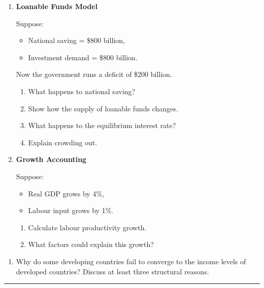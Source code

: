 \documentclass[12pt]{article}
\begin{document}
\begin{enumerate}[label=\textbf{\arabic*.}, start=4]

\item \textbf{Loanable Funds Model}

Suppose:
\begin{itemize}
    \item National saving = \$800 billion,
    \item Investment demand = \$800 billion.
\end{itemize}

Now the government runs a deficit of \$200 billion.

\begin{enumerate}
    \item[(a)] What happens to national saving?
    \item[(b)] Show how the supply of loanable funds changes.
    \item[(c)] What happens to the equilibrium interest rate?
    \item[(d)] Explain crowding out.
\end{enumerate}
\newpage
\item \textbf{Growth Accounting}

Suppose:
\begin{itemize}
    \item Real GDP grows by 4\%,
    \item Labour input grows by 1\%.
\end{itemize}

\begin{enumerate}
    \item[(a)] Calculate labour productivity growth.
    \item[(b)] What factors could explain this growth?
\end{enumerate}

\end{enumerate}



\begin{enumerate}[label=\textbf{\arabic*.}, start=6]

\item Why do some developing countries fail to converge to the income levels of developed countries? 
Discuss at least three structural reasons.

\end{enumerate}

\hrule
\vspace{1em}
\end{document}
